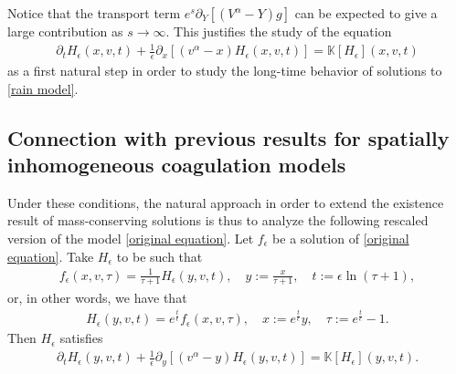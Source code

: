 \documentclass[11pt]{article}
\numberwithin{equation}{section}
\begin{document}
Notice that the transport term $e^{s}\partial_{Y}[(V^{\alpha}-Y)g]$ can be expected to give a large contribution as $s\rightarrow \infty$. This justifies the study of the equation
\begin{align*}
    \partial_{t}H_{\epsilon}(x,v,t)+\frac{1}{\epsilon}\partial_{x}[(v^{\alpha}-x)H_{\epsilon}(x,v,t)]=\mathbb{K}[H_{\epsilon}](x,v,t)
\end{align*} as a first natural step in order to study the long-time behavior of solutions to \eqref{rain model}.

\subsection{Connection with previous results for spatially inhomogeneous coagulation models}

Under these conditions, the natural approach in order to extend the existence result of mass-conserving solutions is thus to analyze the following rescaled version of the model \eqref{original equation}. Let $f_{\epsilon}$ be a solution of \eqref{original equation}. Take $H_{\epsilon}$ to be such that
\begin{align}\label{rain model to our model}
f_{\epsilon}(x,v,\tau)=\frac{1}{\tau+1}H_{\epsilon}(y,v,t), \quad y:=\frac{x}{\tau+1}, \quad t:=\epsilon \ln(\tau+1),
\end{align}
or, in other words, we have that
\begin{align}\label{our model to rain model}
H_{\epsilon}(y,v,t)=e^{\frac{t}{\epsilon}}f_{\epsilon}(x,v,\tau), \quad x:=e^{\frac{t}{\epsilon}}y, \quad \tau:=e^{\frac{t}{\epsilon}}-1.
\end{align}
Then $H_{\epsilon}$ satisfies
\begin{align}\label{diagonal equation}
\partial_{t}H_{\epsilon}(y,v,t)+\frac{1}{\epsilon}\partial_{y}[(v^{\alpha}-y)H_{\epsilon}(y,v,t)]=\mathbb{K}[H_{\epsilon}](y,v,t).
\end{align}
\end{document}
